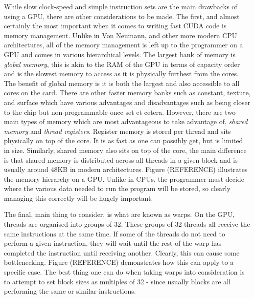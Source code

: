 While slow clock-speed and simple instruction sets are the main drawbacks of using a GPU, there are other considerations to be made. The first, and almost certainly the most important when it comes to writing fast CUDA code is memory management. Unlike in Von Neumann, and other more modern CPU architectures, all of the memory management is left up to the programmer on a GPU and comes in various hierarchical levels. The largest bank of memory is \textit{global memory}, this is akin to the RAM of the GPU in terms of capacity order and is the slowest memory to access as it is physically furthest from the cores. The benefit of global memory is it is both the largest and also accessible to all cores on the card. There are other faster memory banks such as constant, texture, and surface which have various advantages and disadvantages such as being closer to the chip but non-programmable once set et cetera. However, there are two main types of memory which are most advantageous to take advantage of, \textit{shared memory} and \textit{thread registers}. Register memory is stored per thread and sits physically on top of the core. It is as fast as one can possibly get, but is limited in size. Similarly, shared memory also sits on top of the core, the main difference is that shared memory is distributed across all threads in a given block and is usually around 48KB in modern architectures. Figure (REFERENCE) illustrates the memory hierarchy on a GPU. Unlike in CPUs, the programmer must decide where the various data needed to run the program will be stored, so clearly managing this correctly will be hugely important.

The final, main thing to consider, is what are known as warps. On the GPU, threads are organised into groups of 32. These groups of 32 threads all receive the same instructions at the same time. If some of the threads do not need to perform a given instruction, they will wait until the rest of the warp has completed the instruction until receiving another. Clearly, this can cause some bottlenecking. Figure (REFERENCE) demonstrates how this can apply to a specific case. The best thing one can do when taking warps into consideration is to attempt to set block sizes as multiples of 32 - since usually blocks are all performing the same or similar instructions.

